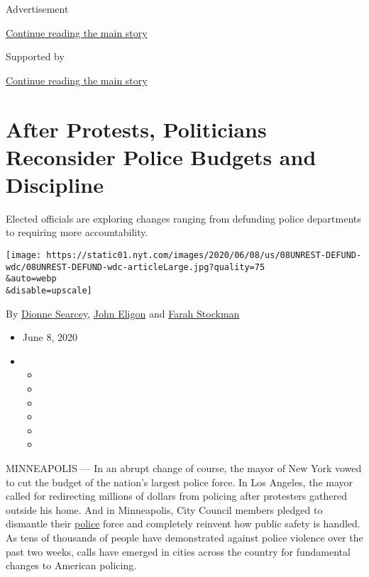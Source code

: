 Advertisement

\protect\hyperlink{after-top}{Continue reading the main story}

Supported by

\protect\hyperlink{after-sponsor}{Continue reading the main story}

\hypertarget{after-protests-politicians-reconsider-police-budgets-and-discipline}{%
\section{After Protests, Politicians Reconsider Police Budgets and
Discipline}\label{after-protests-politicians-reconsider-police-budgets-and-discipline}}

Elected officials are exploring changes ranging from defunding police
departments to requiring more accountability.

\texttt{[image: https://static01.nyt.com/images/2020/06/08/us/08UNREST-DEFUND-wdc/08UNREST-DEFUND-wdc-articleLarge.jpg?quality=75\\\&auto=webp\\\&disable=upscale]}

By \href{https://www.nytimes.com/by/dionne-searcey}{Dionne Searcey},
\href{https://www.nytimes.com/by/john-eligon}{John Eligon} and
\href{https://www.nytimes.com/by/farah-stockman}{Farah Stockman}

\begin{itemize}
\item
  June 8, 2020
\item
  \begin{itemize}
  \item
  \item
  \item
  \item
  \item
  \item
  \end{itemize}
\end{itemize}

MINNEAPOLIS --- In an abrupt change of course, the mayor of New York
vowed to cut the budget of the nation's largest police force. In Los
Angeles, the mayor called for redirecting millions of dollars from
policing after protesters gathered outside his home. And in Minneapolis,
City Council members pledged to dismantle their
\href{https://www.nytimes.com/2020/06/09/us/ca-defund-police.html}{police}
force and completely reinvent how public safety is handled. As tens of
thousands of people have demonstrated against police violence over the
past two weeks, calls have emerged in cities across the country for
fundamental changes to American policing.

